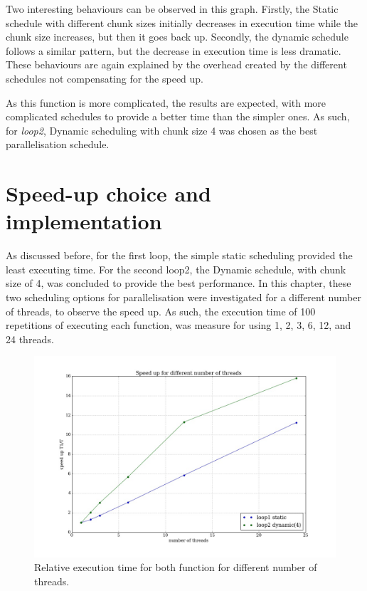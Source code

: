 \documentclass[12pt]{article}
\begin{document}
	Two interesting behaviours can be observed in this graph. Firstly, the Static schedule with different chunk sizes initially decreases in execution time while the chunk size increases, but then it goes back up. Secondly, the dynamic schedule follows a similar pattern, but the decrease in execution time is less dramatic. These behaviours are again explained by the overhead created by the different schedules not compensating for the speed up.
	
	As this function is more complicated, the results are expected, with more complicated schedules to provide a better time than the simpler ones. As such, for \textit{loop2}, Dynamic scheduling with chunk size 4 was chosen as the best parallelisation schedule. 
	
	\pagebreak
	
	
	\section{Speed-up choice and implementation}
	As discussed before, for the first loop, the simple static scheduling provided the least executing time. For the second loop2, the Dynamic schedule, with chunk size of 4, was concluded to provide the best performance. In this chapter, these two scheduling options for parallelisation were investigated for a different number of threads, to observe the speed up. As such, the execution time of 100 repetitions of executing each function, was measure for using 1, 2, 3, 6, 12, and 24 threads.
	
	\begin{figure}[H]	
		\centering
		\includegraphics[scale=0.4]{speed_up.jpeg}
		\caption{Relative execution time for both function for different number of threads.}\label{up}
	\end{figure}	
\end{document}
